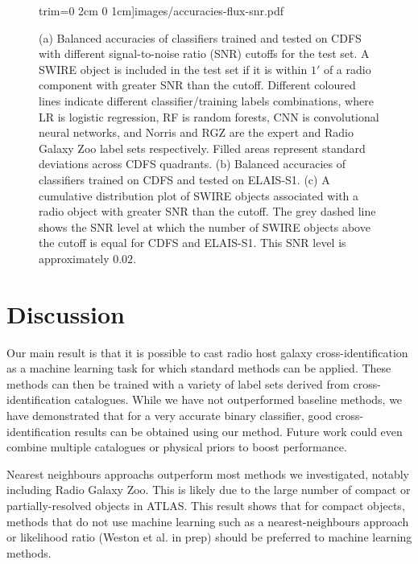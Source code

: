 \documentclass[fleqn,usenatbib,usedcolumn]{mnras}
\begin{document}
\begin{figure}
                     trim={0 2cm 0 1cm}]{images/accuracies-flux-snr.pdf}
    \caption{(a) Balanced accuracies of classifiers trained and tested on CDFS
      with different signal-to-noise ratio (SNR) cutoffs for the test set. A
      SWIRE object is included in the test set if it is within $1'$ of a radio
      component with greater SNR than the cutoff. Different coloured lines
      indicate different classifier/training labels combinations, where LR is
      logistic regression, RF is random forests, CNN is convolutional neural
      networks, and Norris and RGZ are the expert and Radio Galaxy Zoo label
      sets respectively. Filled areas represent standard deviations across
      CDFS quadrants. (b) Balanced accuracies of classifiers trained on CDFS
      and tested on ELAIS-S1. (c) A cumulative distribution plot of SWIRE
      objects associated with a radio object with greater SNR than the cutoff.
      The grey dashed line shows the SNR level at which the number of SWIRE
      objects above the cutoff is equal for CDFS and ELAIS-S1. This SNR level
      is approximately $0.02$.}
    \label{fig:accuracies-flux}
  \end{figure}

\section{Discussion}

  Our main result is that it is possible to cast radio host galaxy
  cross-identification as a machine learning task for which standard methods
  can be applied. These methods can then be trained with a variety of label
  sets derived from cross-identification catalogues. While we have not outperformed baseline methods, we have demonstrated that for a very accurate binary classifier, good cross-identification results can be obtained using our method. Future work could even combine multiple catalogues or physical priors to boost performance.

  Nearest neighbours approachs outperform most methods we investigated, notably including Radio Galaxy Zoo. This is likely due to the large number of compact or partially-resolved objects in ATLAS. This result shows that for compact
  objects, methods that do not use machine learning such as a
  nearest-neighbours approach or likelihood ratio (Weston et al. in prep) should be
  preferred to machine learning methods.
\end{document}
